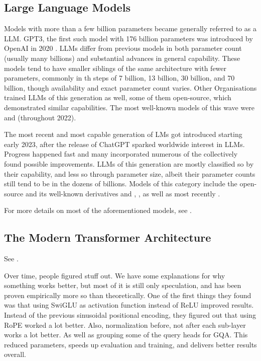 
\subsection{Large Language Models}\label{sub:llm}
Models with more than a few billion parameters became generally referred to as a \acrlong{LLM}. \gls{GPT3}, the first such model with 176 billion parameters was introduced by \gls{OpenAI} in 2020 \cite{brown_language_2020}.
\glspl{LLM} differ from previous models in both parameter count (usually many billions) and substantial advances in general capability.
These models tend to have smaller siblings of the same architecture with fewer parameters, commonly in th steps of 7 billion, 13 billion, 30 billion, and 70 billion, though availability and exact parameter count varies.
Other Organisations trained \glspl{LLM} of this generation as well, some of them open-source, which demonstrated similar capabilities.
The most well-known models of this wave were  and  (throughout 2022).

The most recent and most capable generation of \glspl{LM} got introduced starting early 2023, after the release of \gls{ChatGPT} sparked worldwide interest in \glspl{LLM}. Progress happened fast and many incorporated numerous of the collectively found possible improvements. \glspl{LLM} of this generation are mostly classified so by their capability, and less so through parameter size, albeit their parameter counts still tend to be in the dozens of billions. Models of this category include the open-source  and its well-known derivatives  and , , as well as most recently .

For more details on most of the aforementioned models, see .

\subsection{The Modern Transformer Architecture}\label{sub:modern}
See .

Over time, people figured stuff out. We have some explanations for why something works better, but most of it is still only speculation, and has been proven empirically more so than theoretically. 
One of the first things they found was that using SwiGLU as activation function instead of ReLU improved results. 
Instead of the previous sinusoidal positional encoding, they figured out that using \gls{RoPE} worked a lot better.
Also, normalization before, not after each sub-layer works a lot better.
As well as grouping some of the query heads for \gls{GQA}. This reduced parameters, speeds up evaluation and training, and delivers better results overall.


